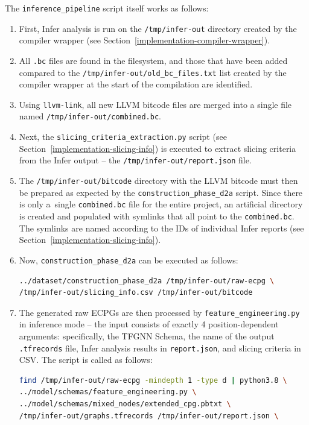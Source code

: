 The \texttt{inference\_pipeline} script itself works as follows:
\begin{enumerate}
    \item First, Infer analysis is run on the \texttt{/tmp/infer-out} directory created by the compiler wrapper (see Section~\ref{implementation-compiler-wrapper}).
    \item All \texttt{.bc} files are found in the filesystem, and those that have been added compared to the \texttt{/tmp/infer-out/old\_bc\_files.txt} list created by the compiler wrapper at the start of the compilation are identified.
    \item Using \texttt{llvm-link}, all new LLVM bitcode files are merged into a single file named \texttt{/tmp/infer-out/combined.bc}.
    \item Next, the \texttt{slicing\_criteria\_extraction.py} script (see Section~\ref{implementation-slicing-info}) is executed to extract slicing criteria from the Infer output -- the \texttt{/tmp/infer-out/report.json} file.
    \item The \texttt{/tmp/infer-out/bitcode} directory with the LLVM bitcode must then be prepared as expected by the \texttt{construction\_phase\_d2a} script. Since there is only a~single \texttt{combined.bc} file for the entire project, an artificial directory is created and populated with symlinks that all point to the \texttt{combined.bc}. The symlinks are named according to the IDs of individual Infer reports (see Section~\ref{implementation-slicing-info}).
    \item Now, \texttt{construction\_phase\_d2a} can be executed as follows:
\begin{lstlisting}[language=bash, xleftmargin=2em]
../dataset/construction_phase_d2a /tmp/infer-out/raw-ecpg \
/tmp/infer-out/slicing_info.csv /tmp/infer-out/bitcode
\end{lstlisting}
    \item The generated raw ECPGs are then processed by \texttt{feature\_engineering.py} in inference mode -- the input consists of exactly 4 position-dependent arguments: specifically, the TFGNN Schema, the name of the output \texttt{.tfrecords} file, Infer analysis results in \texttt{report.json}, and slicing criteria in CSV. The script is called as follows:
\begin{lstlisting}[language=bash, xleftmargin=2em]
find /tmp/infer-out/raw-ecpg -mindepth 1 -type d | python3.8 \
../model/schemas/feature_engineering.py \
../model/schemas/mixed_nodes/extended_cpg.pbtxt \
/tmp/infer-out/graphs.tfrecords /tmp/infer-out/report.json \

\end{lstlisting}
\end{enumerate}

